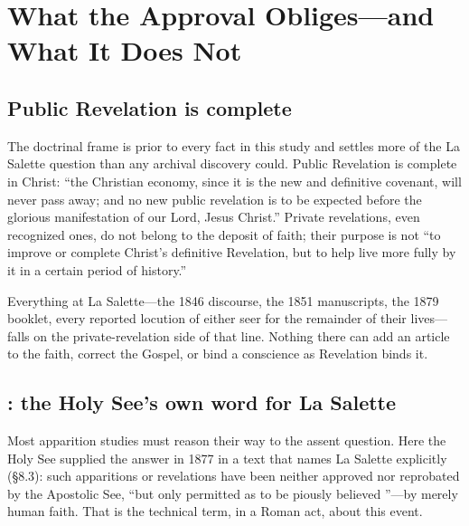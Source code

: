 \section{What the Approval Obliges---and What It Does Not}

\subsection{Public Revelation is complete}

The doctrinal frame is prior to every fact in this study and settles
more of the La Salette question than any archival discovery could.
Public Revelation is complete in Christ: ``the Christian economy,
since it is the new and definitive covenant, will never pass away;
and no new public revelation is to be expected before the glorious
manifestation of our Lord, Jesus Christ.'' Private revelations, even
recognized ones, do not belong to the deposit of faith; their purpose
is not ``to improve or complete Christ's definitive Revelation, but
to help live more fully by it in a certain period of
history.''

Everything at La Salette---the 1846 discourse, the 1851 manuscripts,
the 1879 booklet, every reported locution of either seer for the
remainder of their lives---falls on the private-revelation side of
that line. Nothing there can add an article to the faith, correct
the Gospel, or bind a conscience as Revelation binds it.

\subsection{: the Holy See's own word for La
Salette}

Most apparition studies must reason their way to the assent
question. Here the Holy See supplied the answer in 1877 in a text
that names La Salette explicitly (\S8.3): such apparitions or
revelations have been neither approved nor reprobated by the
Apostolic See, ``but only permitted as to be piously believed
''---by merely human faith. That is the
technical term, in a Roman act, about this event.

